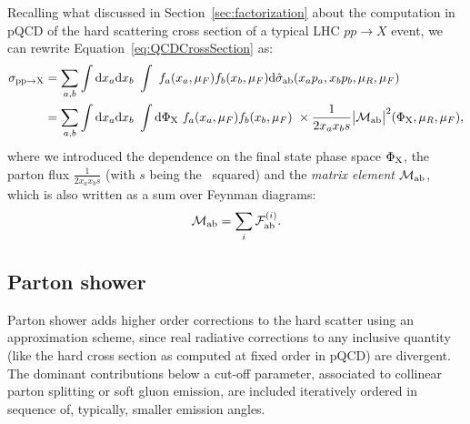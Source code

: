 Recalling what discussed in Section~\ref{sec:factorization} about the computation in pQCD
of the hard scattering cross section of a typical LHC $pp\to X$ event, we can rewrite
Equation~\ref{eq:QCDCrossSection} as:
\begin{equation}
\begin{split}
  \sigma_{{\rm pp}\to{\rm X}}
  & = \sum_{a,b}%
  \int{\rm d}x_a{\rm d}x_b
  ~ \int
  ~ f_a(x_a,\mu_{F}) f_b(x_b,\mu_{F})
  {\rm d}\hat{\sigma}_{\rm ab}(x_ap_a, x_bp_b,\mu_R,\mu_{F}) \\
  & = \sum_{a,b}%
  \int{\rm d}x_a{\rm d}x_b
  ~ \int{\rm d}\Phi_{\rm X}
  ~ f_a(x_a,\mu_{F}) f_b(x_b,\mu_{F})
  ~ \times \dfrac{1}{2x_ax_bs}\big|\mathcal{M}_{\rm ab}\big|^2(\Phi_{\rm X},\mu_R,\mu_{F}),  \\
\end{split}
\label{eq:matrixelement1}
\end{equation}
where we introduced the dependence on the final state phase space $\Phi_{\rm X}$, the parton flux
$\frac{1}{2x_ax_bs}$ (with $s$ being the \cme\ squared) and the {\it matrix element} $\mathcal{M}_{\rm ab}$,
which is also written as a sum over Feynman diagrams:
\begin{equation}\label{eq:matrixelement2}
\mathcal{M}_{\rm ab} = \sum_i \mathcal{F}^{(i)}_{\rm ab}.
\end{equation}




\subsection{Parton shower}\label{sec:partonshower}

Parton shower adds higher order corrections to the hard scatter using an approximation scheme,
since real radiative corrections to any inclusive quantity (like the hard cross section as computed at
fixed order in pQCD) are divergent. The dominant contributions below a cut-off parameter, associated to 
collinear parton splitting or soft gluon emission, are included iteratively ordered in sequence of, typically, smaller emission angles.

